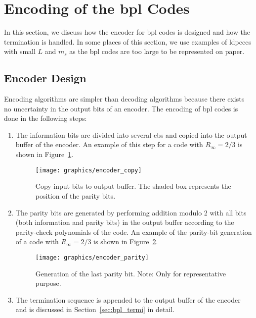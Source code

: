 \section{Encoding of the \acl{bpl} Codes}\label{sec:encode}
In this section, we discuss how the encoder for \ac{bpl} codes is designed and how the termination is handled. In some places of this section, we use examples of \acp{ldpccc} with small $L$ and $m_s$ as the \ac{bpl} codes are too large to be represented on paper.

\subsection{Encoder Design}\label{sec:enc_design}
Encoding algorithms are simpler than decoding algorithms because there exists no uncertainty in the output bits of an encoder. The encoding of \ac{bpl} codes is done in the following steps:
\begin{enumerate}
  \item The information bits are divided into several \acp{cb} and copied into the output buffer of the encoder. An example of this step for a code with $R_\infty=2/3$ is shown in Figure~\ref{fig:encode_copy}.
  \begin{figure}[htbp]
    \centering
    \texttt{[image: graphics/encoder\_copy]}
    \caption{Copy input bits to output buffer. The shaded box represents the position of the parity bits.}
    \label{fig:encode_copy}
  \end{figure}
  \item The parity bits are generated by performing addition modulo 2 with all bits (both information and parity bits) in the output buffer according to the parity-check polynomials of the code. An example of the parity-bit generation of a code with $R_\infty=2/3$ is shown in Figure~\ref{fig:encoder_paritygen}.
   \begin{figure}[htbp]
    \centering
    \texttt{[image: graphics/encoder\_parity]}
    \caption{Generation of the last parity bit. Note: Only for representative purpose.}
    \label{fig:encoder_paritygen}
  \end{figure}
  \item The termination sequence is appended to the output buffer of the encoder and is discussed in Section~\ref{sec:bpl_termi} in detail.
\end{enumerate}

